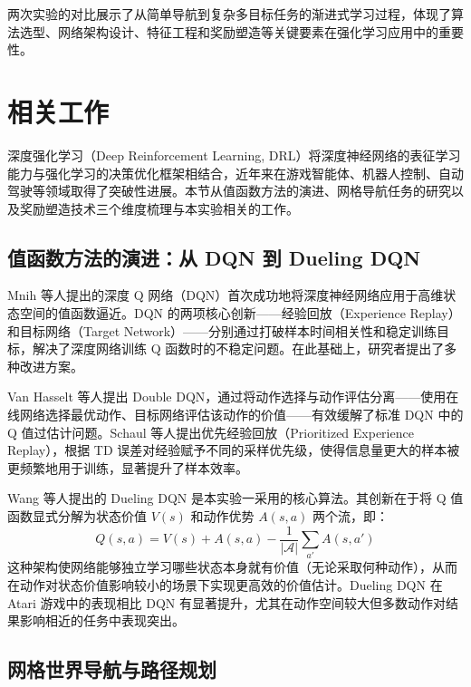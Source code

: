 \documentclass[12pt,a4paper]{article}
\begin{document}
两次实验的对比展示了从简单导航到复杂多目标任务的渐进式学习过程，体现了算法选型、网络架构设计、特征工程和奖励塑造等关键要素在强化学习应用中的重要性。

\section{相关工作}

深度强化学习（Deep Reinforcement Learning, DRL）将深度神经网络的表征学习能力与强化学习的决策优化框架相结合，近年来在游戏智能体、机器人控制、自动驾驶等领域取得了突破性进展。本节从值函数方法的演进、网格导航任务的研究以及奖励塑造技术三个维度梳理与本实验相关的工作。

\subsection{值函数方法的演进：从 DQN 到 Dueling DQN}

Mnih 等人\cite{mnih2015}提出的深度 Q 网络（DQN）首次成功地将深度神经网络应用于高维状态空间的值函数逼近。DQN 的两项核心创新——经验回放（Experience Replay）和目标网络（Target Network）——分别通过打破样本时间相关性和稳定训练目标，解决了深度网络训练 Q 函数时的不稳定问题。在此基础上，研究者提出了多种改进方案。

Van Hasselt 等人\cite{vanhasselt2016}提出 Double DQN，通过将动作选择与动作评估分离——使用在线网络选择最优动作、目标网络评估该动作的价值——有效缓解了标准 DQN 中的 Q 值过估计问题。Schaul 等人\cite{schaul2016}提出优先经验回放（Prioritized Experience Replay），根据 TD 误差对经验赋予不同的采样优先级，使得信息量更大的样本被更频繁地用于训练，显著提升了样本效率。

Wang 等人\cite{wang2016}提出的 Dueling DQN 是本实验一采用的核心算法。其创新在于将 Q 值函数显式分解为状态价值 $V(s)$ 和动作优势 $A(s,a)$ 两个流，即：
\begin{equation}
Q(s,a) = V(s) + A(s,a) - \frac{1}{|\mathcal{A}|}\sum_{a'}A(s,a')
\end{equation}
这种架构使网络能够独立学习哪些状态本身就有价值（无论采取何种动作），从而在动作对状态价值影响较小的场景下实现更高效的价值估计。Dueling DQN 在 Atari 游戏中的表现相比 DQN 有显著提升，尤其在动作空间较大但多数动作对结果影响相近的任务中表现突出。

\subsection{网格世界导航与路径规划}
\end{document}
